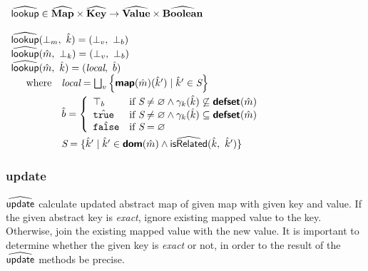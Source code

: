 $\begin{array}{l}
\wsf{lookup} \in \AMap \times \AKey \rightarrow \AVal \times \wbf{Boolean} \\\\

\wsf{lookup}(\bot_m,\ \hat{k}) = (\bot_v,\ \bot_b) \\
\wsf{lookup}(\hat{m},\ \bot_{k}) = (\bot_v,\ \bot_b) \\

\wsf{lookup}(\hat{m},\ \hat{k}) = (\emph{local},\ \hat{b}) \\
\quad \begin{array}{rl} \textrm{where}
& \emph{local} = \bigsqcup_v \left \{ 
\Map(\hat{m})(\hat{k}') \mid \hat{k}' \in \emph{S} \right \} \vspace{1mm}\\
& \hat{b} = \left \{ \begin{array}{ll}
\top_b & \textrm{if } \emph{S} \neq \varnothing \land 
\gamma_k(\hat{k}) \not\subseteq \Defset(\hat{m}) \\
\hat{\texttt{true}} & \textrm{if } \emph{S} \neq \varnothing \land 
\gamma_k(\hat{k}) \subseteq \Defset(\hat{m}) \\
\hat{\texttt{false}} & \textrm{if } \emph{S} = \varnothing \\
\end{array} \right. \vspace{1mm} \\
& \emph{S} = \{ \hat{k}' \mid \hat{k}' \in \Dom(\hat{m})
\land \wsf{isRelated}(\hat{k},\ \hat{k}') \}\\
\end{array} \\
\end{array}$

\subsubsection{update}
$\widehat{\textsf{update}}$ calculate updated abstract map of given map with given key and value.
If the given abstract key is \emph{exact}, ignore existing mapped value to the key.
Otherwise, join the existing mapped value with the new value.
It is important to determine whether the given key is \emph{exact} or not,
in order to the result of the $\widehat{\textsf{update}}$ methods be precise.\\

